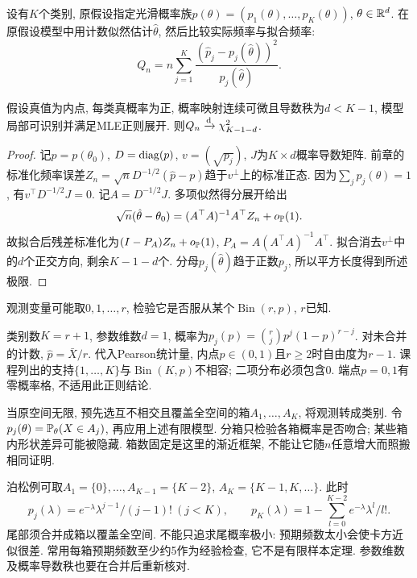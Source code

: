 设有$K$个类别, 原假设指定光滑概率族$p(\theta)=(p_1(\theta),\ldots,p_K(\theta))$, $\theta\in\mathbb R^d$. 在原假设模型中用计数似然估计$\hat\theta$, 然后比较实际频率与拟合频率:
\[
 Q_n=n\sum_{j=1}^K\frac{(\hat p_j-p_j(\hat\theta))^2}{p_j(\hat\theta)}.
\]
\begin{theorem}[估计参数后的自由度]
假设真值为内点, 每类真概率为正, 概率映射连续可微且导数秩为$d<K-1$, 模型局部可识别并满足MLE正则展开. 则$Q_n\xrightarrow{\mathrm d}\chi_{K-1-d}^2$.
\end{theorem}
\begin{proof}
记$p=p(\theta_0)$, $D=\operatorname{diag}(p)$, $v=(\sqrt{p_j})$, $J$为$K\times d$概率导数矩阵. 前章的标准化频率误差$Z_n=\sqrt nD^{-1/2}(\hat p-p)$趋于$v^\perp$上的标准正态. 因为$\sum_jp_j(\theta)=1$, 有$v^\top D^{-1/2}J=0$. 记$A=D^{-1/2}J$. 多项似然得分展开给出
\[
 \sqrt n(\hat\theta-\theta_0)
 =(A^\top A)^{-1}A^\top Z_n+o_{\mathbb P}(1).
\]
故拟合后残差标准化为$(I-P_A)Z_n+o_{\mathbb P}(1)$, $P_A=A(A^\top A)^{-1}A^\top$. 拟合消去$v^\perp$中的$d$个正交方向, 剩余$K-1-d$个. 分母$p_j(\hat\theta)$趋于正数$p_j$, 所以平方长度得到所述极限.
\end{proof}
\begin{example}
观测变量可能取$0,1,\ldots,r$, 检验它是否服从某个$\operatorname{Bin}(r,p)$, $r$已知.
\end{example}
\begin{solution}
类别数$K=r+1$, 参数维数$d=1$, 概率为$p_j(p)=\binom rj p^j(1-p)^{r-j}$. 对未合并的计数, $\hat p=\bar X/r$. 代入Pearson统计量, 内点$p\in(0,1)$且$r\geq2$时自由度为$r-1$. 课程列出的支持$\{1,\ldots,K\}$与$\operatorname{Bin}(K,p)$不相容; 二项分布必须包含0. 端点$p=0,1$有零概率格, 不适用此正则结论.
\end{solution}

当原空间无限, 预先选互不相交且覆盖全空间的箱$A_1,\ldots,A_K$, 将观测转成类别. 令$p_j(\theta)=\mathbb P_\theta(X\in A_j)$, 再应用上述有限模型. 分箱只检验各箱概率是否吻合; 某些箱内形状差异可能被隐藏. 箱数固定是这里的渐近框架, 不能让它随$n$任意增大而照搬相同证明.

泊松例可取$A_1=\{0\},\ldots,A_{K-1}=\{K-2\}$, $A_K=\{K-1,K,\ldots\}$. 此时
\[
 p_j(\lambda)=e^{-\lambda}\lambda^{j-1}/(j-1)!\ (j<K),\qquad
 p_K(\lambda)=1-\sum_{l=0}^{K-2}e^{-\lambda}\lambda^l/l!.
\]
尾部须合并成箱以覆盖全空间. 不能只追求尾概率极小: 预期频数太小会使卡方近似很差. 常用每箱预期频数至少约5作为经验检查, 它不是有限样本定理. 参数维数及概率导数秩也要在合并后重新核对.

